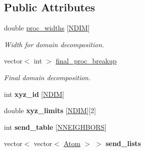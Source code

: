\subsection*{Public Attributes}
\begin{DoxyCompactItemize}
\item 
\hypertarget{classSystem_aaa7b1f86ae1a3c465907f931a04a6e24}{double \hyperlink{classSystem_aaa7b1f86ae1a3c465907f931a04a6e24}{proc\-\_\-widths} \mbox{[}\hyperlink{global_8h_ac92befc9e919a4caa991cbddc2455f6a}{N\-D\-I\-M}\mbox{]}}\label{classSystem_aaa7b1f86ae1a3c465907f931a04a6e24}

\begin{DoxyCompactList}\small\item\em Width for domain decomposition. \end{DoxyCompactList}\item 
\hypertarget{classSystem_a21ce85ec8f0e69a4d30f972b1e15d2bf}{vector$<$ int $>$ \hyperlink{classSystem_a21ce85ec8f0e69a4d30f972b1e15d2bf}{final\-\_\-proc\-\_\-breakup}}\label{classSystem_a21ce85ec8f0e69a4d30f972b1e15d2bf}

\begin{DoxyCompactList}\small\item\em Final domain decomposition. \end{DoxyCompactList}\item 
\hypertarget{classSystem_a2a5944a369bc1fdc8e93789dda5664b4}{int {\bfseries xyz\-\_\-id} \mbox{[}\hyperlink{global_8h_ac92befc9e919a4caa991cbddc2455f6a}{N\-D\-I\-M}\mbox{]}}\label{classSystem_a2a5944a369bc1fdc8e93789dda5664b4}

\item 
\hypertarget{classSystem_a50c76799e166bf7c2f75c8da176aa6d6}{double {\bfseries xyz\-\_\-limits} \mbox{[}\hyperlink{global_8h_ac92befc9e919a4caa991cbddc2455f6a}{N\-D\-I\-M}\mbox{]}\mbox{[}2\mbox{]}}\label{classSystem_a50c76799e166bf7c2f75c8da176aa6d6}

\item 
\hypertarget{classSystem_a6205d74e1ed4e018db409d7a011f567b}{int {\bfseries send\-\_\-table} \mbox{[}\hyperlink{global_8h_a0cee284b3e8b8dfb5a81d6c756123ae6}{N\-N\-E\-I\-G\-H\-B\-O\-R\-S}\mbox{]}}\label{classSystem_a6205d74e1ed4e018db409d7a011f567b}

\item 
\hypertarget{classSystem_a8a8c0cb1f49192795390b9764d8aecfc}{vector$<$ vector$<$ \hyperlink{structAtom}{Atom} $>$ $>$ {\bfseries send\-\_\-lists}}\label{classSystem_a8a8c0cb1f49192795390b9764d8aecfc}


\end{DoxyCompactItemize}
